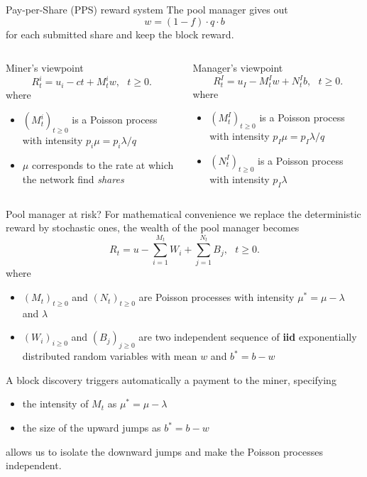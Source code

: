 \documentclass{beamer}
\makeatletter
\newcommand*{\iid}{\textbf{iid}\@\xspace}
\makeatother
\begin{document}
\begin{frame}{Pay-per-Share (PPS) reward system}
\scriptsize
The pool manager gives out
$$
w = (1-f)\cdot q \cdot b 
$$ 
for each submitted share and keep the block reward.
\vspace{1cm}
\begin{columns}
\begin{column}{0.5\textwidth}
Miner's viewpoint
$$
R_t^i = u_i-ct + M_t^i w,\text{ }t\geq0.
$$
where 
\begin{itemize}
   \item $(M_t^i)_{t\geq0}$ is a Poisson process with intensity $p_i \mu= p_i\lambda / q$
   \item $\mu$ corresponds to the rate at which the network find \textit{shares}
\end{itemize}
\end{column}
\begin{column}{0.5\textwidth}
Manager's viewpoint
$$
R_t^I = u_I - M_t^I w+N_t^I b,\text{ }t\geq0.
$$
where 
\begin{itemize}
   \item $(M_t^I)_{t\geq0}$ is a Poisson process with intensity $p_I\mu =p_I\lambda / q$
   \item $(N_t^I)_{t\geq0}$ is a Poisson process with intensity $p_I\lambda$
\end{itemize}
\end{column}
\end{columns}
\end{frame}
\begin{frame}{Pool manager at risk?}
\scriptsize
For mathematical convenience we replace the deterministic reward by stochastic ones, the wealth of the pool manager becomes
$$
R_t= u - \sum_{i=1}^{M_t} W_i +\sum_{j=1}^{N_t} B_j,\text{ }t\geq0.
$$
where 
\begin{itemize}
  \item $(M_t)_{t\geq0}$ and $(N_t)_{t\geq0}$ are Poisson processes with intensity $\mu^\ast=\mu- \lambda$ and $\lambda$
  \item $(W_i)_{i\geq0}$ and $(B_j)_{j\geq0}$ are two independent sequence of \iid exponentially distributed random variables with mean $w$ and $b^\ast = b-w$
\end{itemize}
\begin{tcolorbox}[enhanced,drop shadow, title=Poisson process superposition]
A block discovery triggers automatically a payment to the miner, specifying 
\begin{itemize}
\item the intensity of $M_t$ as $\mu^\ast=\mu- \lambda$ 
\item the size of the upward jumps as $b^\ast = b-w$ 
\end{itemize}
allows us to isolate the downward jumps and make the Poisson processes independent. 
\end{tcolorbox}
\end{frame}
\end{document}
